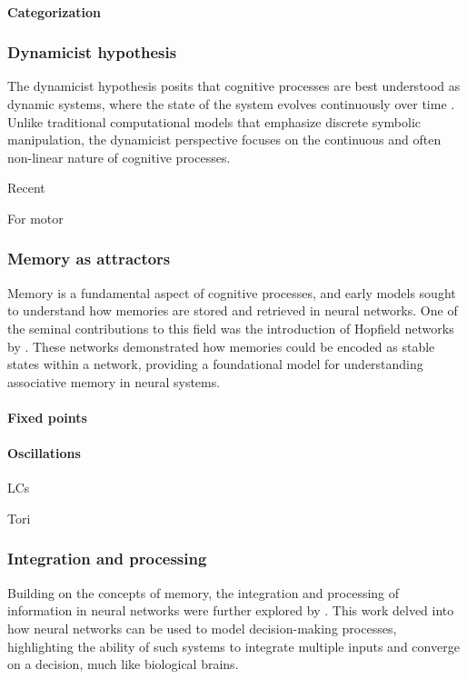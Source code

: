 \documentclass{scrartcl}
\theoremstyle{definition}
\theoremstyle{remark}
\begin{document}
\paragraph{Categorization}
\citep{zhou2022compression}



\subsubsection{Dynamicist hypothesis}
The dynamicist hypothesis posits that cognitive processes are best understood as dynamic systems, where the state of the system evolves continuously over time  \citep{vangelder1995cognition, vangelder1995motion, vangelder1998dynamical}.
 Unlike traditional computational models that emphasize discrete symbolic manipulation, the dynamicist perspective focuses on the continuous and often non-linear nature of cognitive processes.


Recent \citep{beer2023dynamics}

For motor \citep{wang2022representation}


\subsubsection{Memory as attractors}
Memory is a fundamental aspect of cognitive processes, and early models sought to understand how memories are stored and retrieved in neural networks.
 One of the seminal contributions to this field was the introduction of Hopfield networks by \cite{hopfield1982neural}.
 These networks demonstrated how memories could be encoded as stable states within a network, providing a foundational model for understanding associative memory in neural systems.

\citep{ashwin2024network}


\paragraph{Fixed points}

\paragraph{Oscillations}
\citep{winder2009oscillatory}
\citep{duecker2023oscillations, pals2024trained}

LCs 

Tori

\subsubsection{Integration and processing}
Building on the concepts of memory, the integration and processing of information in neural networks were further explored by \cite{hopfield1985decisions}.
 This work delved into how neural networks can be used to model decision-making processes, highlighting the ability of such systems to integrate multiple inputs and converge on a decision, much like biological brains.
\end{document}
